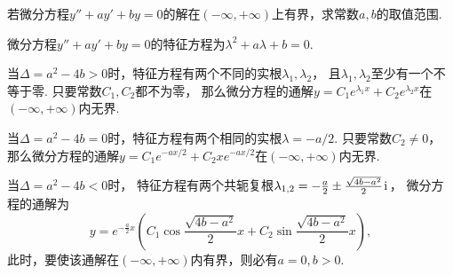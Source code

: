\begin{example}
若微分方程\(y''+ay'+by=0\)的解在\((-\infty,+\infty)\)上有界，求常数\(a,b\)的取值范围.
\begin{solution}
微分方程\(y''+ay'+by=0\)的特征方程为\(\lambda^2 + a\lambda+b = 0\).

当\(\Delta=a^2-4b>0\)时，特征方程有两个不同的实根\(\lambda_1,\lambda_2\)，
且\(\lambda_1,\lambda_2\)至少有一个不等于零.
只要常数\(C_1,C_2\)都不为零，
那么微分方程的通解\(y = C_1 e^{\lambda_1 x} + C_2 e^{\lambda_2 x}\)在\((-\infty,+\infty)\)内无界.

当\(\Delta=a^2-4b=0\)时，特征方程有两个相同的实根\(\lambda=-a/2\).
只要常数\(C_2\neq0\)，
那么微分方程的通解\(y = C_1 e^{-ax/2} + C_2 x e^{-ax/2}\)在\((-\infty,+\infty)\)内无界.

当\(\Delta=a^2-4b<0\)时，
特征方程有两个共轭复根\(\lambda_{1,2}=-\frac{a}{2}\pm\frac{\sqrt{4b-a^2}}{2}\kern1pt\mathrm{i}\kern1pt\)，
微分方程的通解为\begin{equation*}
	y = e^{-\frac{a}{2}x} \left( C_1 \cos\frac{\sqrt{4b-a^2}}{2}x + C_2 \sin\frac{\sqrt{4b-a^2}}{2}x \right),
\end{equation*}
此时，要使该通解在\((-\infty,+\infty)\)内有界，则必有\(a = 0, b > 0\).
\end{solution}
\end{example}

